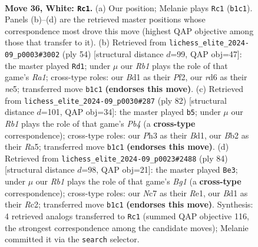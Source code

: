 \documentclass[11pt]{article}
\begin{document}
\clearpage

\begin{figure}[p]\centering
\begin{subfigure}{0.46\textwidth}\centering
\resizebox{\linewidth}{!}{%
\newchessgame
\chessboard[
  setfen={1nb2k2/1pNn4/3r1p2/p2p2p1/1b4Pp/1P2P2P/PB2PK2/1R1B4 w - - 6 36},
  showmover=false,
  pgfstyle=straightmove, color=movearrow, markmove={b1-c1}
]}
\caption{}
\end{subfigure}\hfill
\begin{subfigure}{0.46\textwidth}\centering
\resizebox{\linewidth}{!}{%
\newchessgame
\chessboard[
  setfen={5r1k/7p/p1bNpp2/1p2n3/2p1P3/7P/PPB2PP1/R5K1 w - - 2 28},
  showmover=false,
  pgfstyle=straightmove, color=movearrow, markmove={a1-d1}
]}
\caption{}
\end{subfigure}
\\[4pt]
\begin{subfigure}{0.46\textwidth}\centering
\resizebox{\linewidth}{!}{%
\newchessgame
\chessboard[
  setfen={3n2r1/1k1b1pp1/4p2p/R2pP2N/1Pp2PPP/2P5/3K4/3B4 w - - 17 42},
  showmover=false,
  pgfstyle=straightmove, color=movearrow, markmove={b4-b5}
]}
\caption{}
\end{subfigure}\hfill
\begin{subfigure}{0.46\textwidth}\centering
\resizebox{\linewidth}{!}{%
\newchessgame
\chessboard[
  setfen={8/1b2prk1/1p1p4/p2n2p1/P2P3p/1P3P1P/2R3P1/4R1BK w - - 3 43},
  showmover=false,
  pgfstyle=straightmove, color=movearrow, markmove={g1-e3}
]}
\caption{}
\end{subfigure}
\caption{\textbf{Move 36, White: \texttt{Rc1}.} (a) Our position; Melanie plays \texttt{Rc1} (\texttt{b1c1}). Panels (b)--(d) are the retrieved master positions whose correspondence most drove this move (highest QAP objective among those that transfer to it). (b) Retrieved from \texttt{lichess\_elite\_2024-09\_p0003\#3002} (ply 54) [structural distance $d$=99, QAP obj=47]: the master played \texttt{Rd1}; under $\mu$ our \emph{Rb1} plays the role of that game's \emph{Ra1}; cross-type roles: our \emph{B}d1 as their \emph{P}f2, our \emph{r}d6 as their \emph{n}e5; transferred move \texttt{b1c1} \textbf{(endorses this move)}. (c) Retrieved from \texttt{lichess\_elite\_2024-09\_p0030\#287} (ply 82) [structural distance $d$=101, QAP obj=34]: the master played \texttt{b5}; under $\mu$ our \emph{Rb1} plays the role of that game's \emph{Pb4} (a \textbf{cross-type} correspondence); cross-type roles: our \emph{P}h3 as their \emph{B}d1, our \emph{B}b2 as their \emph{R}a5; transferred move \texttt{b1c1} \textbf{(endorses this move)}. (d) Retrieved from \texttt{lichess\_elite\_2024-09\_p0023\#2488} (ply 84) [structural distance $d$=98, QAP obj=21]: the master played \texttt{Be3}; under $\mu$ our \emph{Rb1} plays the role of that game's \emph{Bg1} (a \textbf{cross-type} correspondence); cross-type roles: our \emph{N}c7 as their \emph{R}e1, our \emph{B}d1 as their \emph{R}c2; transferred move \texttt{b1c1} \textbf{(endorses this move)}. Synthesis: 4 retrieved analogs transferred to \texttt{Rc1} (summed QAP objective 116, the strongest correspondence among the candidate moves); Melanie committed it via the \texttt{search} selector.}
\label{fig:thought-m70}
\end{figure}
\end{document}
